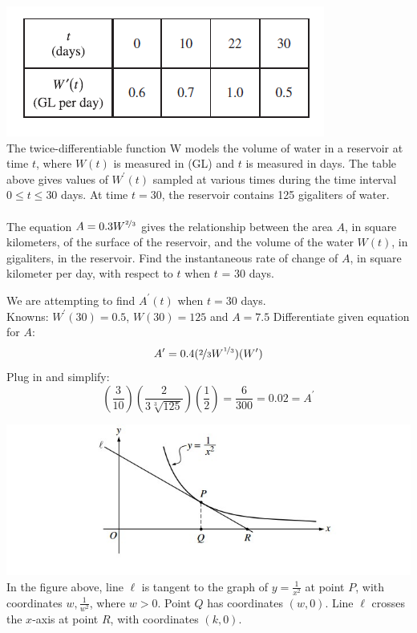 \documentclass[12pt,letterpaper, onecolumn]{exam}
\begin{document}
\begin{questions}
		\question \includegraphics[width=0.5\linewidth]{Question08-001}\\
		The twice-differentiable function W models the volume of water in a reservoir at time $t$, where $W(t)$ is measured in (GL) and $t$ is measured in days. The table above gives values of $W^{\prime}(t)$ sampled at various times during the time interval $0 \leq t \leq 30$ days. At time $t = 30$, the reservoir contains 125 gigaliters of water. \\ \\
		The equation $A = 0.3W^{\nicefrac{2}{3}}$ gives the relationship between the area $A$, in square kilometers, of the surface of the reservoir, and the volume of the water $W(t)$, in gigaliters, in the reservoir. Find the instantaneous rate of change of $A$, in square kilometer per day, with respect to $t$ when $t$ = 30 days.
		\begin{solution}
			We are attempting to find $A^{\prime}(t)$ when $t=30$ days. \\
			Knowns: $W^\prime(30) = 0.5$, $W(30)=125$ and $A=7.5$
			Differentiate given equation for $A$:
			$$A^{\prime} = 0.4(\nicefrac{2}{3}W^{\nicefrac{1}{3}})(W^{\prime})$$
			Plug in and simplify:
			$$\left( \frac{3}{10}\right) \left( \frac{2}{3 \sqrt[3]{125}}\right) \left( \frac{1}{2}\right)  = \frac{6}{300} = \boxed{0.02 = A^{\prime}}$$
		\end{solution}
		\question 
		\includegraphics{Question09-001} \\
		In the figure above, line $\ell$ is tangent to the graph of $y = \frac{1}{x^2}$ at point $P$, with coordinates $w,\frac{1}{w^2}$, where $w > 0$. Point $Q$ has coordinates $(w, 0)$. Line $\ell$ crosses the $x$-axis at point $R$, with coordinates $(k, 0)$.
			\begin{parts}

\end{parts}
\end{questions}
\end{document}
